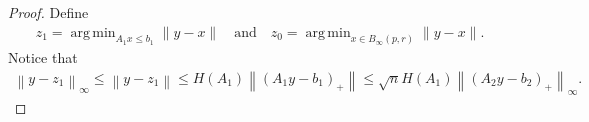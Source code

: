 \documentclass{article}
\theoremstyle{case}
\numberwithin{theorem}{subsection}
\DeclareMathOperator*{\argmin}{arg\,min}
\newcommand{\atr}{A^{\infty}}
\newcommand{\btr}{b^{\infty}}
\newcommand{\Rn}{\mathbb R^n}
\begin{document}
\begin{proof}
Define
\begin{align*}
z_1 = \argmin_{A_1 x \le b_1} \|y - x\|
\quad \textrm{and} \quad
z_0 = \argmin_{x \in B_{\infty}(p, r)} \|y - x\|.
\end{align*}
Notice that
\begin{align}
\left\|y - z_1\right\|_{\infty}
\le \left\|y - z_1\right\|
\le H\left(A_1\right) \left\|\left(A_1y - b_1\right)_+\right\|
\le \sqrt{n} H\left(A_1\right) \left\|\left(A_2y - b_2\right)_+\right\|_{\infty}.
\label{hoi_computation_1}
\end{align}


% 
% 
% 
% 



\end{proof}
\end{document}
